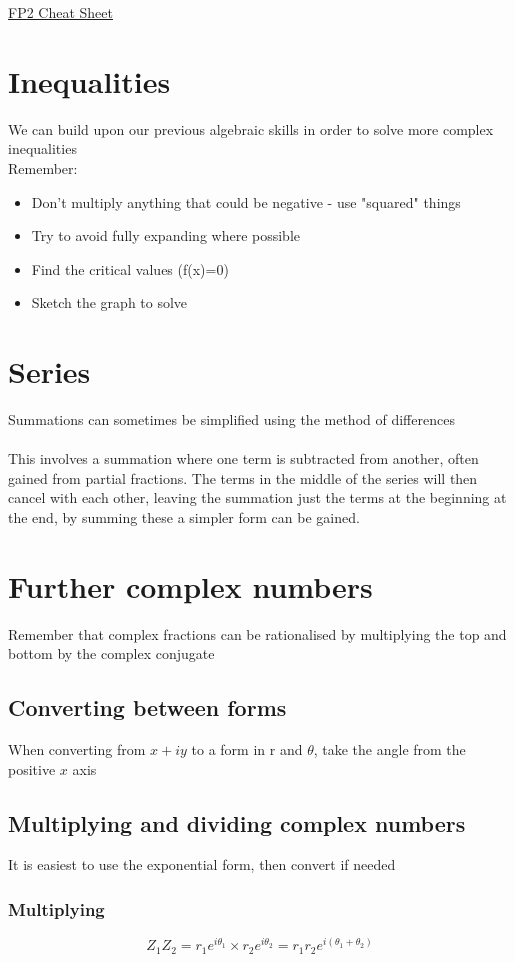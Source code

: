 \documentclass{article}[18pt]
\begin{document}
\begin{center}
\underline{\huge FP2 Cheat Sheet}
\end{center}
\section{Inequalities}
We can build upon our previous algebraic skills in order to solve more complex inequalities\\
Remember:
\begin{itemize}
\item Don't multiply anything that could be negative - use "squared" things
\item Try to avoid fully expanding where possible
\item Find the critical values (f(x)=0)
\item Sketch the graph to solve
\end{itemize}
\section{Series}
Summations can sometimes be simplified using the method of differences\\
\\
This involves a summation where one term is subtracted from another, often gained from partial fractions. The terms in the middle of the series will then cancel with each other, leaving the summation just the terms at the beginning at the end, by summing these a simpler form can be gained.
\section{Further complex numbers}
Remember that complex fractions can be rationalised by multiplying the top and bottom by the complex conjugate
\subsection{Converting between forms}
When converting from $x+iy$ to a form in r and $\theta$, take the angle from the positive $x$ axis
\subsection{Multiplying and dividing complex numbers}
It is easiest to use the exponential form, then convert if needed
\subsubsection{Multiplying}
$$Z_1Z_2=r_1e^{i\theta_1}\times r_2e^{i\theta_2}=r_1r_2e^{i(\theta_1+\theta_2)}$$
\end{document}

